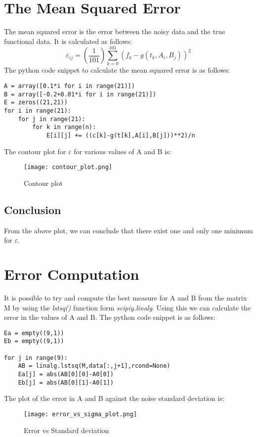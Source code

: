 \documentclass[11pt, a4paper]{article}
\begin{document}
\section{The Mean Squared Error}
The mean squared error is the error between the noisy data and the true functional data. It is calculated as follows:
$$\varepsilon_{ij} = (\frac{1}{101})\sum_{k=0}^{101}(f_{k} - g(t_{k},A_{i},B_{j}))^{2}$$
The python code snippet to calculate the mean squared error is as follows:
\begin{verbatim}	
A = array([0.1*i for i in range(21)])
B = array([-0.2+0.01*i for i in range(21)])
E = zeros((21,21))
for i in range(21):
    for j in range(21):
        for k in range(n):
            E[i][j] += ((c[k]-g(t[k],A[i],B[j]))**2)/n
\end{verbatim}
The contour plot for $\varepsilon$ for various values of A and B is:
	\begin{figure}[!tbh]
   	\centering
   	\texttt{[image: contour\_plot.png]}   
   	\caption{Contour plot}
   \end{figure} 
     
\subsection*{Conclusion}
From the above plot, we can conclude that there exist one and only one minimum for $\varepsilon$.

\section{Error Computation} 
It is possible to try and compute the best measure for A and B from the matrix M by using the \textit{lstsq()} function form \textit{scipiy.linalg}.
Using this we can calculate the error in the values of A and B. The python code snippet is as follows:
\begin{verbatim}	
Ea = empty((9,1))
Eb = empty((9,1))

for j in range(9):	
    AB = linalg.lstsq(M,data[:,j+1],rcond=None)
    Ea[j] = abs(AB[0][0]-A0[0])
    Eb[j] = abs(AB[0][1]-A0[1])
\end{verbatim}

The plot of the error in A and B against the noise standard deviation is:
	\begin{figure}[!tbh]
   	\centering
   	\texttt{[image: error\_vs\_sigma\_plot.png]}   
   	\caption{Error vs Standard deviation}
   \end{figure} 
\end{document}
